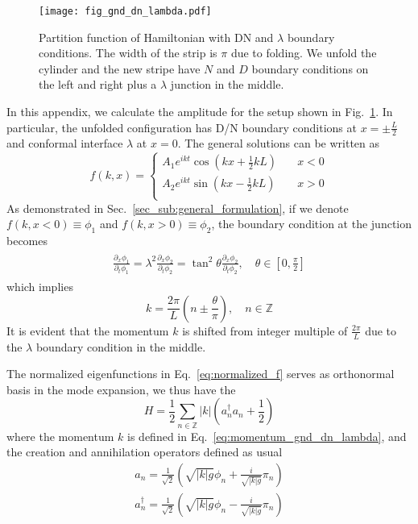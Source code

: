 
\begin{figure}[h]
\centering
\texttt{[image: fig\_gnd\_dn\_lambda.pdf]}
\caption{Partition function of Hamiltonian with DN and $\lambda$ boundary conditions. The width of the strip is $\pi$ due to folding. We unfold the cylinder and the new stripe have $N$ and $D$ boundary conditions on the left and right plus a $\lambda$ junction in the middle. }
\label{fig:Fig_gnd_dn_lambda}
\end{figure}

In this appendix, we calculate the amplitude for the setup shown in Fig.~\ref{fig:Fig_gnd_dn_lambda}. In particular, the unfolded configuration has D/N boundary conditions at $x = \pm \frac{L}{2}$ and conformal interface $\lambda$ at $x = 0$. The general solutions can be written as
\begin{equation}
\label{eq:normalized_f}
f(k, x) = 
\left\lbrace
\begin{aligned}
  A_1 e^{i kt} \cos\left(kx +\frac{1}{2}kL \right) &  \quad x < 0  \\
  A_2 e^{ikt}  \sin\left(kx - \frac{1}{2}kL \right) & \quad x > 0   \\
\end{aligned} \right. 
\end{equation}
As demonstrated in Sec.~\ref{sec_sub:general_formulation}, if we denote $f(k,x<0)\equiv\phi_1$ and $f(k,x>0)\equiv\phi_2$, the boundary condition at the junction becomes
\begin{eqnarray}\begin{aligned}
\frac{\partial_x \phi_1}{ \partial_t \phi_1} = \lambda^2 \frac{\partial_x \phi_2}{ \partial_t \phi_2} = \tan^2 \theta\frac{\partial_x \phi_2}{ \partial_t \phi_2}, \quad \theta \in \left[0,\frac{\pi}{2} \right]  
\end{aligned}\end{eqnarray}
which implies
\begin{equation}
\label{eq:momentum_gnd_dn_lambda}
k = \frac{2\pi}{L}\left( n \pm \frac{\theta}{\pi} \right),  \quad n\in\mathbb{Z}
\end{equation}
It is evident that the momentum $k$ is shifted from integer multiple of $\frac{2\pi}{L}$ due to the $\lambda$ boundary condition in the middle. 

The normalized eigenfunctions in Eq.~\eqref{eq:normalized_f} serves as orthonormal basis in the mode expansion, we thus have the 
\begin{equation}
\label{eq:H_in_gnd_dn_lambda}
H = \frac{1}{2} \sum_{n \in \mathbb{Z} } |k|  \left(a^{\dagger}_n a_n + \frac{1}{2} \right)
\end{equation}
where the momentum $k$ is defined in Eq.~\eqref{eq:momentum_gnd_dn_lambda}, and the creation and annihilation operators defined as usual
\begin{equation}
\begin{aligned}
a_n = \frac{1}{\sqrt{2}} \left( \sqrt{ |k|g} \phi_n + \frac{i }{\sqrt{|k|g} }\pi_n  \right) \\
a^{\dagger}_n = \frac{1}{\sqrt{2}} \left( \sqrt{ |k|g} \phi_n - \frac{i }{\sqrt{|k|g} }\pi_n  \right) \\
\end{aligned}
\end{equation}

